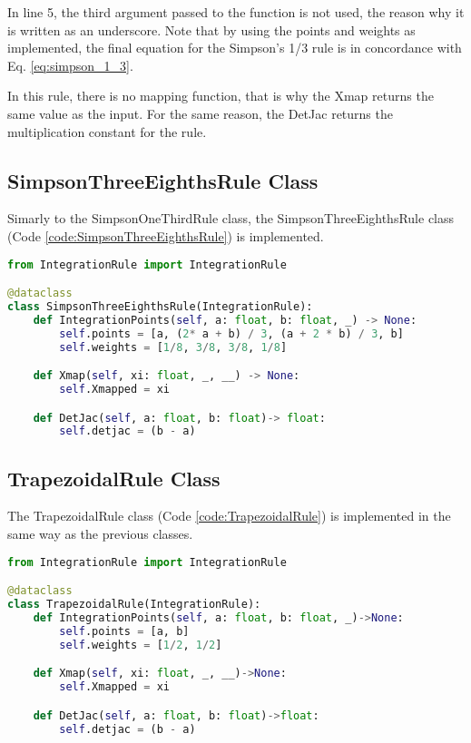 In line 5, the third argument passed to the function is not used, the reason why it is written as an underscore. Note that by using the points and weights as implemented, the final equation for the Simpson's 1/3 rule is in concordance with Eq. \eqref{eq:simpson_1_3}. 

In this rule, there is no mapping function, that is why the Xmap returns the same value as the input. For the same reason, the DetJac returns the multiplication constant for the rule.


\subsection{SimpsonThreeEighthsRule Class}
Simarly to the SimpsonOneThirdRule class, the SimpsonThreeEighthsRule class (Code \ref{code:SimpsonThreeEighthsRule}) is implemented.
\begin{lstlisting}[language=python, caption={SimpsonThreeEighthsRule Class.}, label={code:SimpsonThreeEighthsRule}]
from IntegrationRule import IntegrationRule

@dataclass
class SimpsonThreeEighthsRule(IntegrationRule):
    def IntegrationPoints(self, a: float, b: float, _) -> None:
        self.points = [a, (2* a + b) / 3, (a + 2 * b) / 3, b]
        self.weights = [1/8, 3/8, 3/8, 1/8]

    def Xmap(self, xi: float, _, __) -> None:
        self.Xmapped = xi

    def DetJac(self, a: float, b: float)-> float:
        self.detjac = (b - a)
\end{lstlisting}

\subsection{TrapezoidalRule Class}
The TrapezoidalRule class (Code \ref{code:TrapezoidalRule}) is implemented in the same way as the previous classes.
\begin{lstlisting}[language=python, caption={TrapezoidalRule Class.}, label={code:TrapezoidalRule}]
from IntegrationRule import IntegrationRule

@dataclass
class TrapezoidalRule(IntegrationRule):
    def IntegrationPoints(self, a: float, b: float, _)->None:
        self.points = [a, b]
        self.weights = [1/2, 1/2]

    def Xmap(self, xi: float, _, __)->None:
        self.Xmapped = xi

    def DetJac(self, a: float, b: float)->float:
        self.detjac = (b - a)
\end{lstlisting}

